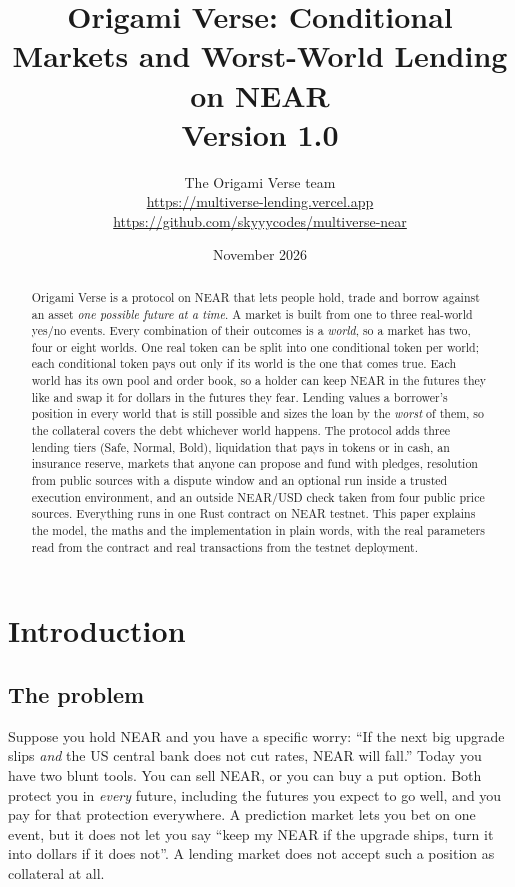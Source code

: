 \documentclass[11pt,a4paper]{article}
\title{\vspace{-1.5em}\textbf{Origami Verse: Conditional Markets and Worst-World Lending on NEAR}\\[0.4em]
\large Version 1.0}
\author{The Origami Verse team\\[0.3em]
\small \url{https://multiverse-lending.vercel.app}\\
\small \url{https://github.com/skyyycodes/multiverse-near}}
\date{November 2026}
\begin{document}
\maketitle
\thispagestyle{fancy}

\begin{abstract}
\noindent
Origami Verse is a protocol on NEAR that lets people hold, trade and borrow against an asset \emph{one possible future at
a time}. A market is built from one to three real-world yes/no events. Every combination of their outcomes is a
\emph{world}, so a market has two, four or eight worlds. One real token can be split into one conditional token per
world; each conditional token pays out only if its world is the one that comes true. Each world has its own pool
and order book, so a holder can keep NEAR in the futures they like and swap it for dollars in the futures they fear.
Lending values a borrower's position in every world that is still possible and sizes the loan by the
\emph{worst} of them, so the collateral covers the debt whichever world happens. The protocol adds three lending
tiers (Safe, Normal, Bold), liquidation that pays in tokens or in cash, an insurance reserve, markets that anyone
can propose and fund with pledges, resolution from public sources with a dispute window and an optional run inside
a trusted execution environment, and an outside NEAR/USD check taken from four public price sources. Everything runs in one
Rust contract on NEAR testnet. This paper explains the model, the maths and the implementation in plain words, with
the real parameters read from the contract and real transactions from the testnet deployment.
\end{abstract}

\setcounter{tocdepth}{1}
\tableofcontents
\vspace{0.5em}

\section{Introduction}
\label{sec:intro}

\subsection{The problem}

Suppose you hold NEAR and you have a specific worry: ``If the next big upgrade slips \emph{and} the US central bank
does not cut rates, NEAR will fall.'' Today you have two blunt tools. You can sell NEAR, or you can buy a put option.
Both protect you in \emph{every} future, including the futures you expect to go well, and you pay for that
protection everywhere. A prediction market lets you bet on one event, but it does not let you say ``keep my NEAR if
the upgrade ships, turn it into dollars if it does not''. A lending market does not accept such a position as
collateral at all.
\end{document}
